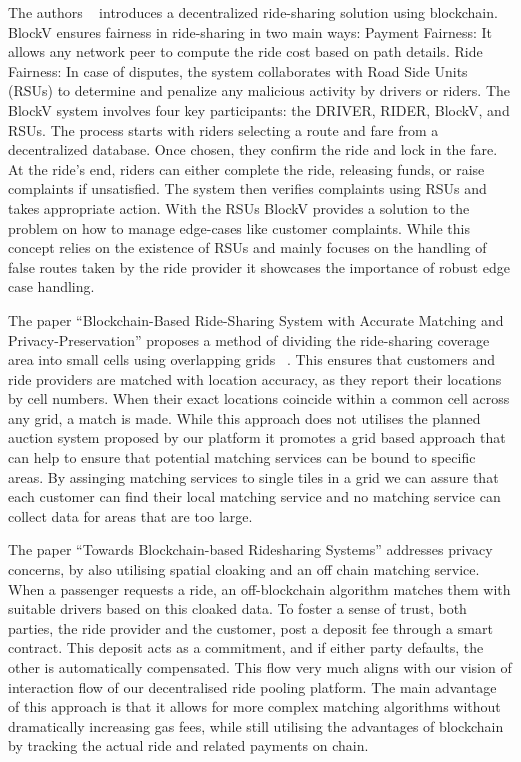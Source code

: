 The authors ~\cite{Pal.}  introduces a decentralized ride-sharing solution using blockchain. BlockV ensures fairness in ride-sharing in two main ways:
Payment Fairness: It allows any network peer to compute the ride cost based on path details.
Ride Fairness: In case of disputes, the system collaborates with Road Side Units (RSUs) to determine and penalize any malicious activity by drivers or riders.
The BlockV system involves four key participants: the DRIVER, RIDER, BlockV, and RSUs. The process starts with riders selecting a route and fare from a decentralized database. Once chosen, they confirm the ride and lock in the fare. At the ride's end, riders can either complete the ride, releasing funds, or raise complaints if unsatisfied. The system then verifies complaints using RSUs and takes appropriate action.
With the RSUs BlockV provides a solution to the problem on how to manage edge-cases like customer complaints. While this concept relies on the existence of RSUs and mainly focuses on the handling of false routes taken by the ride provider it showcases the importance of robust edge case handling.

The paper ``Blockchain-Based Ride-Sharing System with Accurate Matching and Privacy-Preservation'' proposes a method of dividing the ride-sharing coverage area into small cells using overlapping grids ~\cite{Badr.}. This ensures that customers and ride providers are matched with location accuracy, as they report their locations by cell numbers. When their exact locations coincide within a common cell across any grid, a match is made. While this approach does not utilises the planned auction system proposed by our platform it promotes a grid based approach that can help to ensure that potential matching services can be bound to specific areas. By assinging matching services to single tiles in a grid we can assure that each customer can find their local matching service and no matching service can collect data for areas that are too large.


The paper ``Towards Blockchain-based Ridesharing Systems'' addresses privacy concerns, by also utilising spatial cloaking and an off chain matching service.~\cite{Vazquez.} When a passenger requests a ride, an off-blockchain algorithm matches them with suitable drivers based on this cloaked data. To foster a sense of trust, both parties, the ride provider and the customer, post a deposit fee through a smart contract. This deposit acts as a commitment, and if either party defaults, the other is automatically compensated. This flow very much aligns with our vision of interaction flow of our decentralised ride pooling platform. The main advantage of this approach is that it allows for more complex matching algorithms without dramatically increasing gas fees, while still utilising the advantages of blockchain by tracking the actual ride and related payments on chain. 

